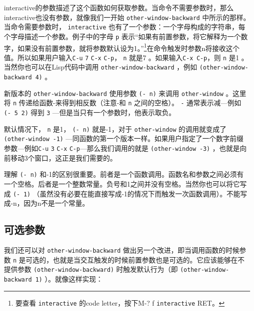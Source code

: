 interactive的参数描述了这个函数如何获取参数。当命令不需要参数时，那么interactive也没有参数，就像我们一开始 \texttt{other-window-backward} 中所示的那样。当命令需要参数时， \texttt{interactive} 也有了一个参数：一个字母构成的字符串，每个字母描述一个参数。例子中的字母 \texttt{p} 表示“如果有前置参数，将它解释为一个数字，如果没有前置参数，就将参数默认设为1。”\footnote{要查看 \texttt{interactive} 的code letter，按下M-? f \texttt{interactive} RET。}在命令触发时参数n将接收这个值。所以如果用户输入\verb|C-u| \verb|7| \verb|C-x| \verb|C-p|， \texttt{n} 就是7 。如果输入\verb|C-x C-p|，则 \texttt{n} 是1 。当然你也可以在Lisp代码中调用 \texttt{other-window-backward} ，例如 \texttt{(other-window-backward 4)} 。

新版本的 \texttt{other-window-backward} 使用参数 \texttt{(- n)} 来调用 \texttt{other-window} 。这里将 \texttt{n} 传递给函数-来得到相反数（注意-和 \texttt{n} 之间的空格）。 \texttt{-} 通常表示减---例如 \texttt{(- 5 2)} 得到 \texttt{3} ---但是当只有一个参数时，他表示取负。

默认情况下， \texttt{n} 是1， \texttt{(- n)} 就是-1，对于 \texttt{other-window} 的调用就变成了 \texttt{(other-window -1)} ---同函数的第一个版本一样。如果用户指定了一个数字前缀参数---例如\verb|C-u| \verb|3| \verb|C-x| \verb|C-p|---那么我们调用的就是 \texttt{(other-window -3)} ，也就是向前移动3个窗口，这正是我们需要的。

理解 \texttt{(- n)} 和-1的区别很重要。前者是一个函数调用。函数名和参数之间必须有一个空格。后者是一个整数常量。负号和1之间并没有空格。当然你也可以将它写成 \texttt{(- 1)} （虽然没有必要在能直接写成-1的情况下而触发一次函数调用）。不能写成-n，因为n不是一个常量。

\subsection{可选参数}
\label{section:02-Making-the-Argument-Optional}

我们还可以对 \texttt{other-window-backward} 做出另一个改进，即当调用函数的时候参数 \texttt{n} 是可选的，也就是当交互触发的时候前置参数也是可选的。它应该能够在不提供参数 \texttt{(other-window-backward)} 时触发默认行为（即 \texttt{(other-window-backward 1)} ）。就像这样实现：


